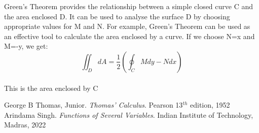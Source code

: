 \documentclass{article}
\begin{document}
Green's Theorem provides the relationship between a simple closed curve C and the area enclosed D.
It can be used to analyse the surface D by choosing appropriate values for M and N. For example, Green's Theorem can be used as an effective tool to calculate the area enclosed by a curve. If we choose N=x and M=-y, we get:\\
\begin{equation}
\iint_{D}dA =\frac{1}{2}(\oint_{C}Mdy-Ndx)
\end{equation}\\
This is the area enclosed by C
\begin{thebibliography}{widest entry}
George B Thomas, Junior. \emph{Thomas' Calculus}. Pearson 13$^{th}$ edition, 1952
Arindama Singh. \emph{Functions of Several Variables}. Indian Institute of Technology, Madras, 2022
\end{thebibliography}
\end{document}
